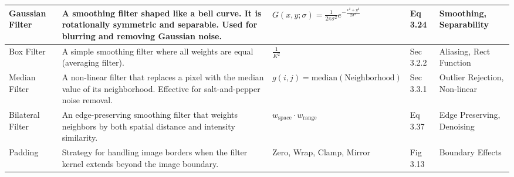 \documentclass[12pt]{article}
\begin{document}
\begin{table}[h!]
\begin{tabular}{|p{2.8cm}|p{4.2cm}|p{3cm}|p{2cm}|p{2.5cm}|}
        Gaussian Filter
                      & A smoothing filter shaped like a bell curve. It is rotationally symmetric and separable. Used for blurring and removing Gaussian noise.
                      & $G(x,y;\sigma)=\frac{1}{2\pi\sigma^2} e^{-\frac{x^2+y^2}{2\sigma^2}}$
                      & Eq 3.24
                      & Smoothing, Separability                                                                                                                                                                                                                \\
        \hline

        Box Filter
                      & A simple smoothing filter where all weights are equal (averaging filter).
                      & $\frac{1}{K^2}$
                      & Sec 3.2.2
                      & Aliasing, Rect Function                                                                                                                                                                                                                \\
        \hline

        Median Filter
                      & A non-linear filter that replaces a pixel with the median value of its neighborhood. Effective for salt-and-pepper noise removal.
                      & $g(i,j)=\mathrm{median}(\text{Neighborhood})$
                      & Sec 3.3.1
                      & Outlier Rejection, Non-linear                                                                                                                                                                                                          \\
        \hline

        Bilateral Filter
                      & An edge-preserving smoothing filter that weights neighbors by both spatial distance and intensity similarity.
                      & $w_{\text{space}} \cdot w_{\text{range}}$
                      & Eq 3.37
                      & Edge Preserving, Denoising                                                                                                                                                                                                             \\
        \hline

        Padding
                      & Strategy for handling image borders when the filter kernel extends beyond the image boundary.
                      & Zero, Wrap, Clamp, Mirror
                      & Fig 3.13
                      & Boundary Effects                                                                                                                                                                                                                       \\
        \hline


\end{tabular}
\end{table}
\end{document}
